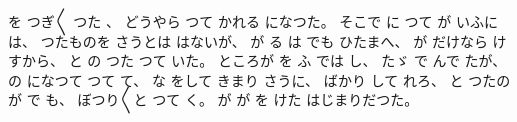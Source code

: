 %
を
つぎ〳〵
つた
、
%
どうやら
つて
かれる
になつた。
%
そこで
に
つて
が
いふには、
%
つたものを
さうとは
はないが、
%
が
る
は
でも
ひたまへ、
%
が
だけなら
け
すから、
%
と
の
つた
つて
いた。
%
ところが
を
ふ
では
し、
%
たゞ
で
んで
たが、
%
の
になつて
つて
て、
%
な
をして
きまり
さうに、
%
ばかり
して
れろ、
%
と
つたのが
で
も、
%
ぼつり〳〵と
つて
く。
%
が
が
を
けた
はじまりだつた。
